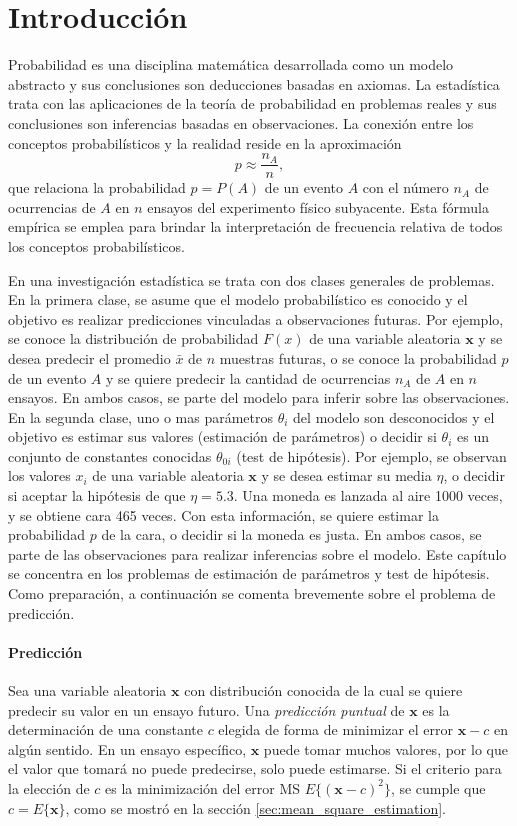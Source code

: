 \documentclass[a4paper]{report}
\newcommand{\x}{\mathbf{x}}
\begin{document}
\section{Introducción}\label{sec:statistics_introduction}

Probabilidad es una disciplina matemática desarrollada como un modelo abstracto y sus conclusiones son deducciones basadas en axiomas. La estadística trata con las aplicaciones de la teoría de probabilidad en problemas reales y sus conclusiones son inferencias basadas en observaciones. La conexión entre los conceptos probabilísticos y la realidad reside en la aproximación
\[
 p\approx\frac{n_A}{n},
\]
que relaciona la probabilidad \(p=P(A)\) de un evento \(A\) con el número \(n_A\) de ocurrencias de \(A\) en \(n\) ensayos del experimento físico subyacente. Esta fórmula empírica se emplea para brindar la interpretación de frecuencia relativa de todos los conceptos probabilísticos.

En una investigación estadística se trata con dos clases generales de problemas. En la primera clase, se asume que el modelo probabilístico es conocido y el objetivo es realizar predicciones vinculadas a observaciones futuras. Por ejemplo, se conoce la distribución de probabilidad \(F(x)\) de una variable aleatoria \(\x\) y se desea predecir el promedio \(\bar{x}\) de \(n\)  muestras futuras, o se conoce la probabilidad \(p\) de un evento \(A\) y se quiere predecir la cantidad de ocurrencias \(n_A\) de \(A\) en \(n\) ensayos. En ambos casos, se parte del modelo para inferir sobre las observaciones. En la segunda clase, uno o mas parámetros \(\theta_i\) del modelo son desconocidos y el objetivo es estimar sus valores (estimación de parámetros) o decidir si \(\theta_i\) es un conjunto de constantes conocidas \(\theta_{0i}\) (test de hipótesis). Por ejemplo, se observan los valores \(x_i\) de una variable aleatoria \(\x\) y se desea estimar su media \(\eta\), o decidir si aceptar la hipótesis de que \(\eta=5.3\). Una moneda es lanzada al aire 1000 veces, y se obtiene cara 465 veces. Con esta información, se quiere estimar la probabilidad \(p\) de la cara, o decidir si la moneda es justa. En ambos casos, se parte de las observaciones para realizar inferencias sobre el modelo. Este capítulo se concentra en los problemas de estimación de parámetros y test de hipótesis. Como preparación, a continuación se comenta brevemente sobre el problema de predicción.

\paragraph{Predicción} Sea una variable aleatoria \(\x\) con distribución conocida de la cual se quiere predecir su valor en un ensayo futuro. Una \emph{predicción puntual} de \(\x\) es la determinación de una constante \(c\) elegida de forma de minimizar el error \(\x-c\) en algún sentido. En un ensayo específico, \(\x\) puede tomar muchos valores, por lo que el valor que tomará no puede predecirse, solo puede estimarse. Si el criterio para la elección de \(c\) es la minimización del error MS \(E\{(\x-c)^2\}\), se cumple que \(c=E\{\x\}\), como se mostró en la sección \ref{sec:mean_square_estimation}. 
\end{document}
